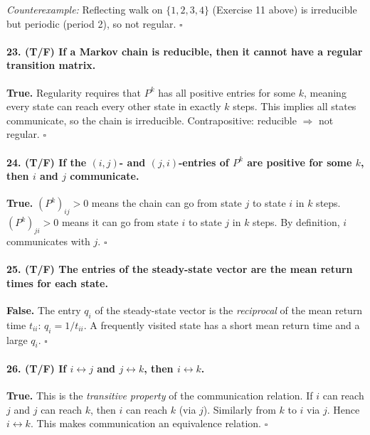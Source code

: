 \documentclass[11pt,a4paper]{article}
\theoremstyle{sol}
\begin{document}
\textit{Counterexample:} Reflecting walk on $\{1,2,3,4\}$ (Exercise 11 above) is irreducible but periodic (period 2), so not regular. $\square$

\paragraph{23. (T/F) If a Markov chain is reducible, then it cannot have a regular transition matrix.}
\textbf{True.} Regularity requires that $P^k$ has all positive entries for some $k$, meaning every state can reach every other state in exactly $k$ steps. This implies all states communicate, so the chain is irreducible. Contrapositive: reducible $\Rightarrow$ not regular. $\square$

\paragraph{24. (T/F) If the $(i,j)$- and $(j,i)$-entries of $P^k$ are positive for some $k$, then $i$ and $j$ communicate.}
\textbf{True.} $(P^k)_{ij}>0$ means the chain can go from state $j$ to state $i$ in $k$ steps. $(P^k)_{ji}>0$ means it can go from state $i$ to state $j$ in $k$ steps. By definition, $i$ communicates with $j$. $\square$

\paragraph{25. (T/F) The entries of the steady-state vector are the mean return times for each state.}
\textbf{False.} The entry $q_i$ of the steady-state vector is the \emph{reciprocal} of the mean return time $t_{ii}$: $q_i = 1/t_{ii}$. A frequently visited state has a short mean return time and a large $q_i$. $\square$

\paragraph{26. (T/F) If $i\leftrightarrow j$ and $j\leftrightarrow k$, then $i\leftrightarrow k$.}
\textbf{True.} This is the \emph{transitive property} of the communication relation. If $i$ can reach $j$ and $j$ can reach $k$, then $i$ can reach $k$ (via $j$). Similarly from $k$ to $i$ via $j$. Hence $i\leftrightarrow k$. This makes communication an equivalence relation. $\square$
\end{document}
